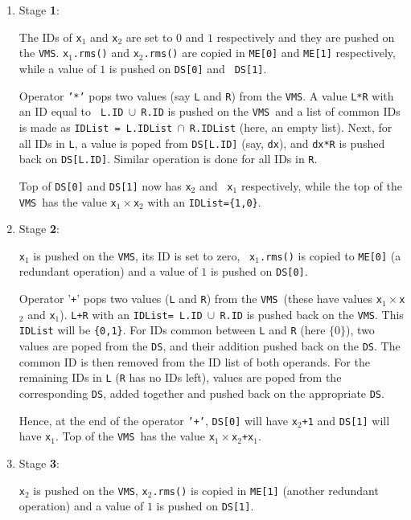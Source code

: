 \documentclass[12pt]{article}
\newcommand{\DS}{{\tt DS}}
\newcommand{\VMS}{{\tt VMS}}
\begin{document}
\begin{enumerate}
\item Stage {\bf 1}:
  
  The IDs of {\tt x$_1$} and {\tt x$_2$} are set to $0$ and $1$
  respectively and they are pushed on the \VMS.  {\tt x$_1$.rms()}
  and {\tt x$_2$.rms()} are copied in {\tt ME[0]} and {\tt ME[1]}
  respectively, while a value of $1$ is pushed on {\tt DS[0]} and {\tt
  DS[1]}.
  

  Operator {\tt '*'} pops two values (say {\tt L} and {\tt R}) from
  the \VMS.  A value {\tt L*R} with an ID equal to {\tt
  L.ID}$~\cup~${\tt R.ID} is pushed on the \VMS\ and a list of common
  IDs is made as {\tt IDList = L.IDList}$~\cap~${\tt R.IDList} (here,
  an empty list).  Next, for all IDs in {\tt L}, a value is poped from
  {\tt DS[L.ID]} (say, {\tt dx}), and {\tt dx*R} is pushed back on
  {\tt DS[L.ID]}.  Similar operation is done for all IDs in {\tt R}.
  
  Top of {\tt DS[0]} and {\tt DS[1]} now has {\tt x$_2$} and {\tt
  x$_1$} respectively, while the top of the \VMS\ has the value
  {\tt x$_1 \times $x$_2$} with an {\tt IDList=\{1,0\}}.

\item Stage {\bf 2}:
  
  {\tt x$_1$} is pushed on the \VMS, its ID is set to zero, {\tt
  x$_1$.rms()} is copied to {\tt ME[0]} (a redundant operation) and a
  value of $1$ is pushed on {\tt DS[0]}.
  
  Operator '{\texttt{+}}' pops two values ({\tt L} and {\tt R}) from the
  \VMS\ (these have values {\tt x$_1\times$x$_2$} and {\tt x$_1$}).
  {\tt L+R} with an {\tt IDList= L.ID}$~\cup~${\tt R.ID} is pushed
  back on the \VMS.  This {\tt IDList} will be {\tt \{0,1\}}.  For IDs
  common between {\tt L} and {\tt R} (here $\{0\}$), two values are
  poped from the \DS, and their addition pushed back on the \DS.  The
  common ID is then removed from the ID list of both operands.  For
  the remaining IDs in {\tt L} ({\tt R} has no IDs left), values are
  poped from the corresponding {\tt DS}, added together and pushed
  back on the appropriate {\tt DS}.
  
  Hence, at the end of the operator {\tt '+'}, {\tt DS[0]} will have
  {\tt x$_2$+1} and {\tt DS[1]} will have {\tt x$_1$}.  Top of the
  \VMS\ has the value {\tt x$_1 \times$x$_2$+x$_1$}.

\item Stage {\bf 3}:
  
  {\tt x$_2$} is pushed on the \VMS, {\tt x$_2$.rms()} is copied
  in {\tt ME[1]} (another redundant operation) and a value of $1$ is
  pushed on {\tt DS[1]}.
  

\end{enumerate}
\end{document}
